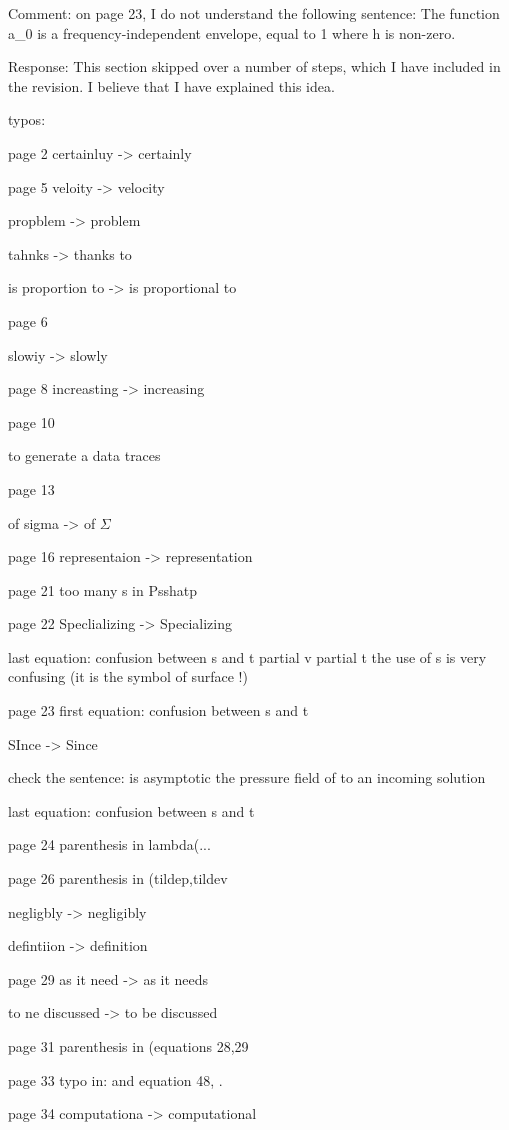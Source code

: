 Comment: on page 23, I do not understand the following sentence:
The function a_0 is a frequency-independent envelope, equal to 1 where h is non-zero.

Response: This section skipped over a number of steps, which I have included in the revision. I believe that I have explained this idea.

typos:

page 2
certainluy
->
certainly

page 5
veloity
->
velocity

propblem
->
problem

tahnks 
->
thanks to

is proportion to 
->
is proportional to

page 6

slowiy
->
slowly

page 8
increasting
->
increasing

page 10

to generate a data traces

page 13

of sigma 
-> 
of $\Sigma$

page 16
representaion 
->
representation 

page 21
too many s in Psshat{p} 

page 22
Speclializing
->
Specializing

last equation: confusion between s and t
partial v partial t
the use of s is very confusing (it is the symbol of surface !)

page 23
first equation: confusion between s and t

SInce 
->
Since

check the sentence:
is asymptotic the pressure field of to an incoming solution

last equation: confusion between s and t

page 24
parenthesis in lambda(...

page 26
parenthesis in (tilde{p},tilde{v}

negligbly -> negligibly

defintiion -> definition

page 29
as it need  
->
as it needs

to ne discussed
->
to be discussed

page 31
parenthesis in (equations 28,29

page 33
typo in: and equation 48, .

page 34
computationa
->
computational

